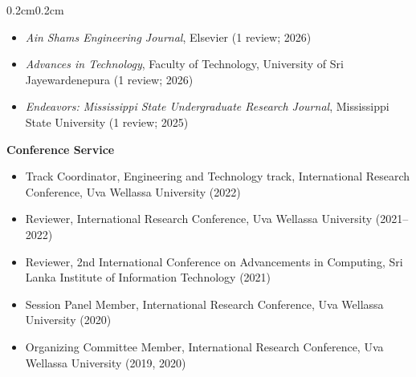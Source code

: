 \documentclass[10pt, letterpaper]{article}
\newenvironment{highlights}{%
    \begin{itemize}[topsep=0.08cm, parsep=0.08cm, partopsep=0pt,
                    itemsep=0pt, leftmargin=0.4cm + 10pt]
}{\end{itemize}}
\newenvironment{onecolentry}{%
    \begin{adjustwidth}{0.2cm}{0.2cm}
}{\end{adjustwidth}}
\begin{document}
\begin{onecolentry}
\begin{highlights}
        \item \emph{Ain Shams Engineering Journal}, Elsevier (1 review; 2026)
        \item \emph{Advances in Technology}, Faculty of Technology, University of Sri
              Jayewardenepura (1 review; 2026)
        \item \emph{Endeavors: Mississippi State Undergraduate Research Journal},
              Mississippi State University (1 review; 2025)
    \end{highlights}
    \vspace{0.10cm}
    \textbf{Conference Service}
    \begin{highlights}
        \item Track Coordinator, Engineering and Technology track, International
              Research Conference, Uva Wellassa University (2022)
        \item Reviewer, International Research Conference, Uva Wellassa University
              (2021--2022)
        \item Reviewer, 2nd International Conference on Advancements in Computing,
              Sri Lanka Institute of Information Technology (2021)
        \item Session Panel Member, International Research Conference,
              Uva Wellassa University (2020)
        \item Organizing Committee Member, International Research Conference,
              Uva Wellassa University (2019, 2020)
    \end{highlights}
\end{onecolentry}
\vspace{0.10cm}

\end{document}
